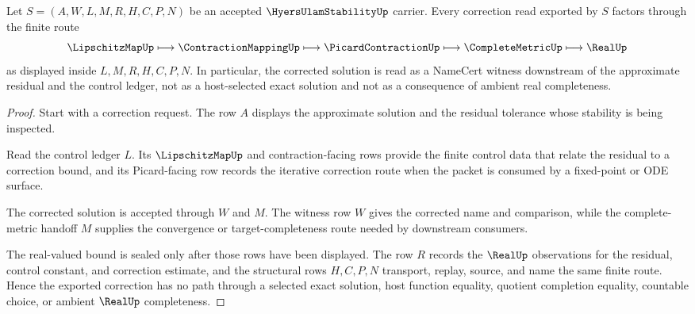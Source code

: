 \begin{theorem}
\label{thm:hyers-ulam-stability-correction-route}
Let $S=(A,W,L,M,R,H,C,P,N)$ be an accepted $\HyersUlamStabilityUp$ carrier. Every correction read exported by $S$ factors through the finite route
$$
\LipschitzMapUp \longmapsto \ContractionMappingUp \longmapsto \PicardContractionUp \longmapsto \CompleteMetricUp \longmapsto \RealUp
$$
as displayed inside $L,M,R,H,C,P,N$. In particular, the corrected solution is read as a NameCert witness downstream of the approximate residual and the control ledger, not as a host-selected exact solution and not as a consequence of ambient real completeness.
\end{theorem}
\begin{proof}
Start with a correction request. The row $A$ displays the approximate solution and the residual tolerance whose stability is being inspected.

Read the control ledger $L$. Its $\LipschitzMapUp$ and contraction-facing rows provide the finite control data that relate the residual to a correction bound, and its Picard-facing row records the iterative correction route when the packet is consumed by a fixed-point or ODE surface.

The corrected solution is accepted through $W$ and $M$. The witness row $W$ gives the corrected name and comparison, while the complete-metric handoff $M$ supplies the convergence or target-completeness route needed by downstream consumers.

The real-valued bound is sealed only after those rows have been displayed. The row $R$ records the $\RealUp$ observations for the residual, control constant, and correction estimate, and the structural rows $H,C,P,N$ transport, replay, source, and name the same finite route. Hence the exported correction has no path through a selected exact solution, host function equality, quotient completion equality, countable choice, or ambient $\RealUp$ completeness.
\end{proof}


